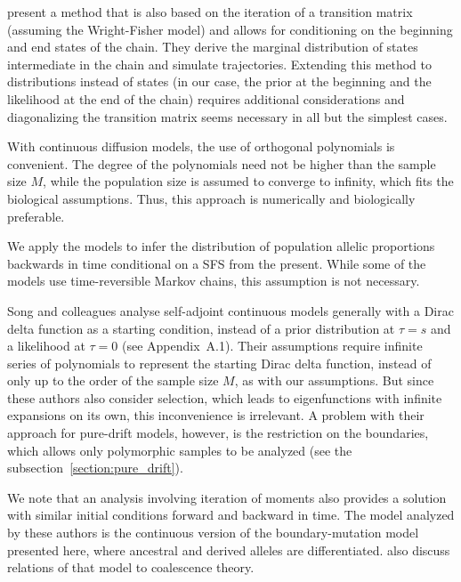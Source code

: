 \documentclass[preprint]{elsarticle}
\begin{document}
\citet{Zhao14} present a method that is also based on the iteration of a transition matrix (assuming the Wright-Fisher model) and allows for conditioning on the beginning and end states of the chain. They derive the marginal distribution of states intermediate in the chain and simulate trajectories. Extending this method to distributions instead of states (in our case, the prior at the beginning and the likelihood at the end of the chain) requires additional considerations and diagonalizing the transition matrix seems necessary in all but the simplest cases. 

With continuous diffusion models, the use of orthogonal polynomials is convenient. The degree of the polynomials need not be higher than the sample size $M$, while the population size is assumed to converge to infinity, which fits the biological assumptions. Thus, this approach is numerically and biologically preferable. 

We apply the models to infer the distribution of population allelic proportions backwards in time conditional on a SFS from the present. While some of the models use time-reversible Markov chains, this assumption is not necessary.%

Song and colleagues \citep{Song12,Stei13,Stei14,Zivk15} analyse self-adjoint continuous models generally with a Dirac delta function as a starting condition, instead of a prior distribution at $\tau=s$ and a likelihood at $\tau=0$ (see Appendix~A.1). Their assumptions require infinite series of polynomials to represent the starting Dirac delta function, instead of only up to the order of the sample size $M$, as with our assumptions. But since these authors also consider selection, which leads to eigenfunctions with infinite expansions on its own, this inconvenience is irrelevant. A problem with their approach for pure-drift models, however, is the restriction on the boundaries, which allows only polymorphic samples to be analyzed (see the subsection~\ref{section:pure_drift}).

We note that an analysis involving iteration of moments \citep{Evan07,Zivk11} also provides a solution with similar initial conditions forward and backward in time. The model analyzed by these authors is the continuous version of the  boundary-mutation model presented here, where ancestral and derived alleles are differentiated. %
\citet{Zivk11} also discuss relations of that model to coalescence theory.
\end{document}

